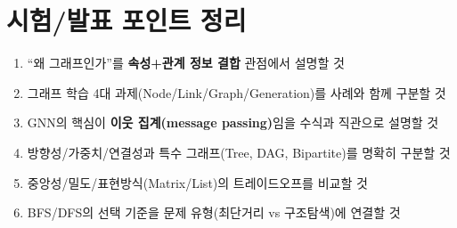 ﻿\documentclass[11pt,a4paper]{article}
\begin{document}
\newpage
\section{시험/발표 포인트 정리}
\begin{enumerate}[leftmargin=*]
  \item ``왜 그래프인가''를 \textbf{속성+관계 정보 결합} 관점에서 설명할 것
  \item 그래프 학습 4대 과제(Node/Link/Graph/Generation)를 사례와 함께 구분할 것
  \item GNN의 핵심이 \textbf{이웃 집계(message passing)}임을 수식과 직관으로 설명할 것
  \item 방향성/가중치/연결성과 특수 그래프(Tree, DAG, Bipartite)를 명확히 구분할 것
  \item 중앙성/밀도/표현방식(Matrix/List)의 트레이드오프를 비교할 것
  \item BFS/DFS의 선택 기준을 문제 유형(최단거리 vs 구조탐색)에 연결할 것
\end{enumerate}
\end{document}
